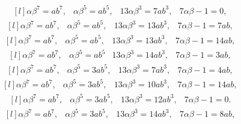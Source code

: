 \documentclass[12pt,a4wide, reqno]{amsart}
\theoremstyle{definition}
\theoremstyle{remark}
\numberwithin{equation}{section}
\begin{document}
\begin{equation}\label{eq59}
    \begin{matrix*}[l]
          \alpha \beta ^7=ab^7, & \alpha \beta ^5=ab^5, & 13\alpha \beta ^3=7ab ^3, & 7\alpha\beta-1=0,
    \end{matrix*}
\end{equation}
\begin{equation}\label{eq60}
    \begin{matrix*}[l]
          \alpha \beta ^7=ab^7, & \alpha \beta ^5=ab^5, & 13\alpha \beta ^3=13ab ^3, & 7\alpha\beta-1=7ab,
    \end{matrix*}
\end{equation}
\begin{equation}\label{eq61}
    \begin{matrix*}[l]
          \alpha \beta ^7=ab^7, & \alpha \beta ^5=ab^5, & 13\alpha \beta ^3=13ab^3, & 7\alpha\beta-1=14ab,
    \end{matrix*}
\end{equation}
\begin{equation}\label{eq62}
    \begin{matrix*}[l]
          \alpha \beta ^7=ab^7, & \alpha \beta ^5=ab^5 & 13\alpha \beta ^3=14ab ^3, & 7\alpha\beta-1=3ab,
    \end{matrix*}
\end{equation}
\begin{equation}\label{eq63}
    \begin{matrix*}[l]
          \alpha \beta ^7=ab^7, & \alpha \beta ^5=3ab^5, & 13\alpha \beta ^3=7ab^3, & 7\alpha\beta-1=4ab,
    \end{matrix*}
\end{equation}
\begin{equation}\label{eq64}
    \begin{matrix*}[l]
          \alpha \beta ^7=ab^7, & \alpha \beta ^5=3ab^5, & 13\alpha \beta ^3=10ab ^3, & 7\alpha\beta-1=14ab,
    \end{matrix*}
\end{equation}
\begin{equation}\label{eq65}
    \begin{matrix*}[l]
          \alpha \beta ^7=ab^7, & \alpha \beta ^5=3ab^5, & 13\alpha \beta ^3=12ab ^3, & 7\alpha\beta-1=0.
    \end{matrix*}
\end{equation}
\begin{equation}\label{eq66}
    \begin{matrix*}[l]
          \alpha \beta ^7=ab^7, & \alpha \beta ^5=3ab^5, & 13\alpha \beta ^3=14ab ^3, & 7\alpha\beta-1=8ab,
    \end{matrix*}
\end{equation}
\end{document}
